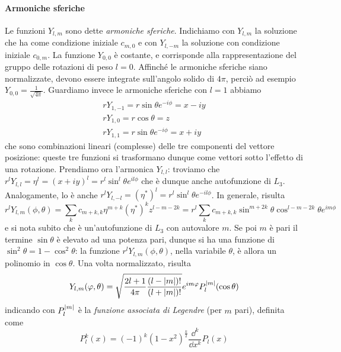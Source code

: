 \paragraph{Armoniche sferiche}
Le funzioni $Y_{l,m}$ sono dette \emph{armoniche sferiche}.
Indichiamo con $Y_{l,m}$ la soluzione che ha come condizione iniziale $c_{m,0}$ e con $Y_{l,-m}$ la soluzione con condizione iniziale $c_{0,m}$.
La funzione $Y_{0,0}$ è costante, e corrisponde alla rappresentazione del gruppo delle rotazioni di peso $l=0$.
Affinch\'e le armoniche sferiche siano normalizzate, devono essere integrate sull'angolo solido di $4\pi$, perciò ad esempio $Y_{0,0}=\frac1{\sqrt{4\pi}}$.
Guardiamo invece le armoniche sferiche con $l=1$ abbiamo
\begin{equation}
	\begin{aligned}
		rY_{1,-1}=r\sin\theta e^{-i\phi}=x-iy\\
		rY_{1,0}=r\cos\theta=z\\
		rY_{1,1}=r\sin\theta e^{-i\phi}=x+iy
	\end{aligned}
	\label{eq:armoniche-sferiche-1}
\end{equation}
che sono combinazioni lineari (complesse) delle tre componenti del vettore posizione: queste tre funzioni si trasformano dunque come vettori sotto l'effetto di una rotazione.
Prendiamo ora l'armonica $Y_{l,l}$: troviamo che $r^lY_{l,l}=\eta^l=(x+iy)^l=r^l\sin^l\theta e^{il\phi}$ che è dunque anche autofunzione di $L_3$.
Analogamente, lo è anche $r^lY_{l,-l}=(\eta^*)^l=r^l\sin^l\theta e^{-il\phi}$.
In generale, risulta
\begin{equation}
	r^lY_{l,m}(\phi,\theta)=\sum_kc_{m+k,k}\eta^{m+k}(\eta^*)^kz^{l-m-2k}=r^l\sum_kc_{m+k,k}\sin^{m+2k}\theta\cos^{l-m-2k}\theta e^{im\phi}
\end{equation}
e si nota subito che è un'autofunzione di $L_3$ con autovalore $m$.
Se poi $m$ è pari il termine $\sin\theta$ è elevato ad una potenza pari, dunque si ha una funzione di $\sin^2\theta=1-\cos^2\theta$: la funzione $r^lY_{l,m}(\phi,\theta)$, nella variabile $\theta$, è allora un polinomio in $\cos\theta$.
Una volta normalizzato, risulta
\begin{equation}
	Y_{l,m}(\varphi,\theta)=\sqrt{\frac{2l+1}{4\pi}\frac{(l-\left|{m}\right|)!}{(l+\left|{m}\right|)!}}e^{im\varphi}P_l^{\left|{m}\right|}(\cos\theta)
	\label{eq:armoniche-sferiche-funzioni-associate-legendre}
\end{equation}
indicando con $P_l^{\left|{m}\right|}$ è la \emph{funzione associata di Legendre} (per $m$ pari), definita come
\begin{equation}
	P_l^k(x)=(-1)^k(1-x^2)^{\frac{k}2}\frac{\dd^k}{\dd x^k}P_l(x)
	\label{eq:funzione-associata-legendre}
\end{equation}
